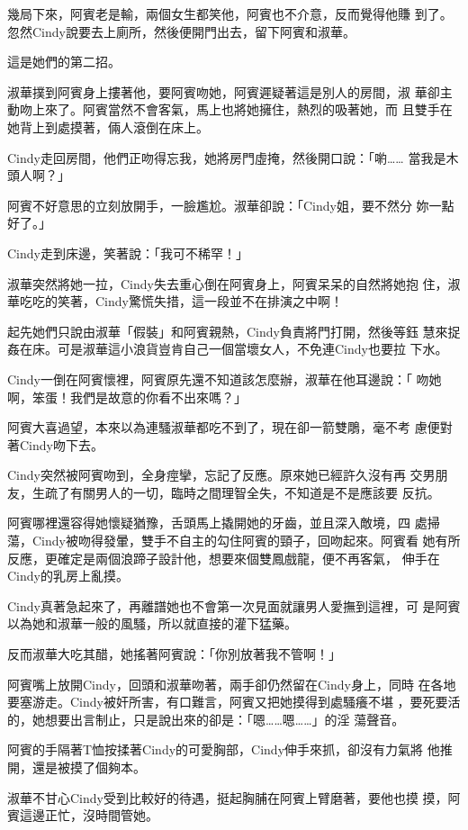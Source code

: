 幾局下來，阿賓老是輸，兩個女生都笑他，阿賓也不介意，反而覺得他賺
到了。忽然Cindy說要去上廁所，然後便開門出去，留下阿賓和淑華。

這是她們的第二招。

淑華撲到阿賓身上摟著他，要阿賓吻她，阿賓遲疑著這是別人的房間，淑
華卻主動吻上來了。阿賓當然不會客氣，馬上也將她擁住，熱烈的吸著她，而
且雙手在她背上到處摸著，倆人滾倒在床上。

Cindy走回房間，他們正吻得忘我，她將房門虛掩，然後開口說：「喲……
當我是木頭人啊？」

阿賓不好意思的立刻放開手，一臉尷尬。淑華卻說：「Cindy姐，要不然分
妳一點好了。」

Cindy走到床邊，笑著說：「我可不稀罕！」

淑華突然將她一拉，Cindy失去重心倒在阿賓身上，阿賓呆呆的自然將她抱
住，淑華吃吃的笑著，Cindy驚慌失措，這一段並不在排演之中啊！

起先她們只說由淑華「假裝」和阿賓親熱，Cindy負責將門打開，然後等鈺
慧來捉姦在床。可是淑華這小浪貨豈肯自己一個當壞女人，不免連Cindy也要拉
下水。

Cindy一倒在阿賓懷裡，阿賓原先還不知道該怎麼辦，淑華在他耳邊說：「
吻她啊，笨蛋！我們是故意的你看不出來嗎？」

阿賓大喜過望，本來以為連騷淑華都吃不到了，現在卻一箭雙鵰，毫不考
慮便對著Cindy吻下去。

Cindy突然被阿賓吻到，全身痙攣，忘記了反應。原來她已經許久沒有再
交男朋友，生疏了有關男人的一切，臨時之間理智全失，不知道是不是應該要
反抗。

阿賓哪裡還容得她懷疑猶豫，舌頭馬上撬開她的牙齒，並且深入敵境，四
處掃蕩，Cindy被吻得發暈，雙手不自主的勾住阿賓的頸子，回吻起來。阿賓看
她有所反應，更確定是兩個浪蹄子設計他，想要來個雙鳳戲龍，便不再客氣，
伸手在Cindy的乳房上亂摸。

Cindy真著急起來了，再離譜她也不會第一次見面就讓男人愛撫到這裡，可
是阿賓以為她和淑華一般的風騷，所以就直接的灌下猛藥。

反而淑華大吃其醋，她搖著阿賓說：「你別放著我不管啊！」

阿賓嘴上放開Cindy，回頭和淑華吻著，兩手卻仍然留在Cindy身上，同時
在各地要塞游走。Cindy被奸所害，有口難言，阿賓又把她摸得到處騷癢不堪
，要死要活的，她想要出言制止，只是說出來的卻是：「嗯……嗯……」的淫
蕩聲音。

阿賓的手隔著T恤按揉著Cindy的可愛胸部，Cindy伸手來抓，卻沒有力氣將
他推開，還是被摸了個夠本。

淑華不甘心Cindy受到比較好的待遇，挺起胸脯在阿賓上臂磨著，要他也摸
摸，阿賓這邊正忙，沒時間管她。

